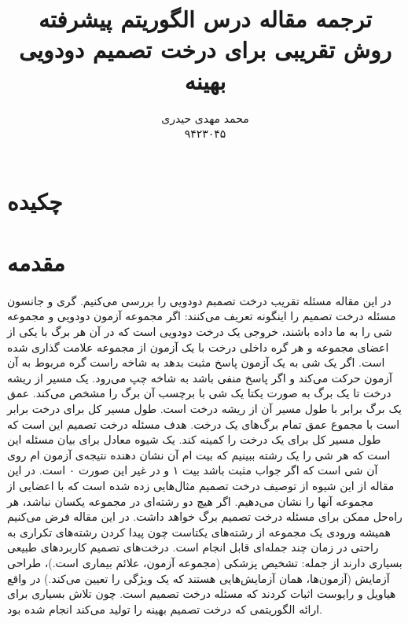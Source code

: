 \documentclass[a4paper]{article}
\title{ترجمه مقاله درس الگوریتم پیشرفته\\
روش تقریبی برای درخت تصمیم دودویی بهینه
}
\author{محمد مهدی حیدری\\۹۴۲۳۰۴۵}
\begin{document}
	\maketitle
	\section*{چکیده}
	\section{مقدمه}
	\paragraph{}
	در این مقاله مسئله تقریب درخت تصمبم دودویی را بررسی می‌کنیم. گری و جانسون مسئله درخت تصمیم را اینگونه تعریف می‌کنند: اگر مجموعه
	آزمون دودویی 
	و مجموعه 
	شی 
	را به ما داده باشند، خروجی یک درخت دودویی است که در آن هر برگ با یکی از اعضای مجموعه 
	و هر گره داخلی درخت با یک آزمون از مجموعه 
	علامت گذاری شده است. اگر یک شی به یک آزمون پاسخ مثبت بدهد به شاخه
	راست گره مربوط به آن آزمون حرکت می‌کند و اگر پاسخ منفی باشد به شاخه چپ می‌رود. یک مسیر از ریشه درخت تا یک برگ 
	به صورت یکتا یک شی با برچسب آن برگ را مشخص می‌کند. عمق یک برگ برابر با طول مسیر آن از ریشه درخت است.
	طول مسیر کل برای درخت برابر است با مجموع عمق تمام برگ‌های یک درخت. هدف مسئله درخت تصمیم این است که طول مسیر کل
	برای یک درخت را کمینه کند. یک شیوه معادل برای بیان مسئله این است که هر شی را یک رشته 
	ببینیم که بیت 
	ام آن نشان دهنده نتیجه‌ی آزمون 
	ام روی آن شی است که اگر جواب مثبت باشد بیت ۱ و در غیر این صورت ۰ است. در این مقاله از این شیوه از توصیف درخت
	تصمیم مثال‌هایی زده شده است که با اعضایی از مجموعه
	آنها را نشان می‌دهیم.
	اگر هیچ دو رشته‌ای در مجموعه
	یکسان نباشد، هر راه‌حل ممکن برای مسئله درخت تصمیم
	برگ خواهد داشت. در این مقاله فرض می‌کنیم همیشه ورودی یک مجموعه از رشته‌های یکتاست چون پیدا کردن رشته‌های تکراری
	به راحتی در زمان چند جمله‌ای قابل انجام است. درخت‌های تصمیم کاربردهای طبیعی بسیاری دارند از جمله: تشخیص پزشکی
	(مجموعه آزمون، علائم بیماری است.)، طراحی آزمایش (آزمون‌ها، همان آزمایش‌هایی هستند که یک ویژگی را تعیین می‌کند.)
	در واقع هیاویل و رایوست اثبات کردند که مسئله درخت تصمیم 
	است. چون تلاش بسیاری برای ارائه الگوریتمی که درخت تصمیم بهینه را تولید می‌کند انجام شده بود.
\end{document}
